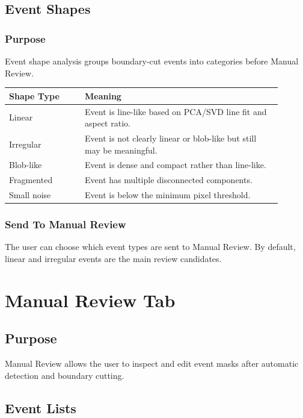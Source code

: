 \documentclass[11pt]{article}
\begin{document}
\subsection{Event Shapes}

\subsubsection{Purpose}

Event shape analysis groups boundary-cut events into categories before Manual Review.

\begin{longtable}{p{0.25\linewidth}p{0.65\linewidth}}
\toprule
\textbf{Shape Type} & \textbf{Meaning} \\
\midrule
Linear & Event is line-like based on PCA/SVD line fit and aspect ratio. \\
Irregular & Event is not clearly linear or blob-like but still may be meaningful. \\
Blob-like & Event is dense and compact rather than line-like. \\
Fragmented & Event has multiple disconnected components. \\
Small noise & Event is below the minimum pixel threshold. \\
\bottomrule
\end{longtable}

\subsubsection{Send To Manual Review}

The user can choose which event types are sent to Manual Review. By default, linear and irregular events are the main review candidates.

\section{Manual Review Tab}

\subsection{Purpose}

Manual Review allows the user to inspect and edit event masks after automatic detection and boundary cutting.

\subsection{Event Lists}
\end{document}
